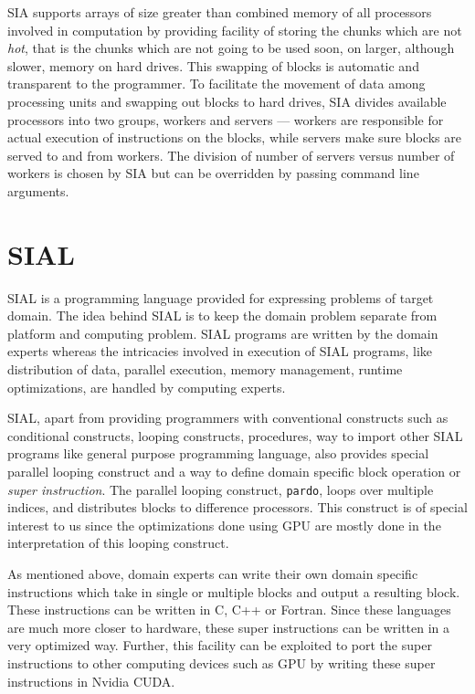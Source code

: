SIA supports arrays of size greater than combined memory of all processors
involved in computation by providing facility of storing the chunks which are
not \textit{hot}, that is the chunks which are not going to be used soon, on
larger, although slower, memory on hard drives. This swapping of blocks is automatic
and transparent to the programmer. To facilitate the movement of data among
processing units and swapping out blocks to hard drives, SIA divides available
processors into two groups, workers and servers --- workers are responsible for
actual execution of instructions on the blocks, while servers make sure blocks
are served to and from workers. The division of number of servers versus number
of workers is chosen by SIA but can be overridden by passing command line
arguments.

\section{SIAL}
SIAL is a programming language provided for expressing problems of target
domain. The idea behind SIAL is to keep the domain problem separate from
platform and computing problem. SIAL programs are written by the domain experts
whereas the intricacies involved in execution of SIAL programs, like distribution of
data, parallel execution, memory management, runtime optimizations, are handled
by computing experts.

SIAL, apart from providing programmers with conventional constructs such as
conditional constructs, looping constructs, procedures, way to import other SIAL
programs like general purpose programming language, also provides special parallel looping construct and a way
to define domain specific block operation or \textit{super instruction}. The
parallel looping construct, \texttt{pardo}, loops over multiple indices, and
distributes blocks to difference processors. This construct is of special
interest to us since the optimizations done using GPU are mostly done in the
interpretation of this looping construct.

As mentioned above, domain experts can write their own domain specific
instructions which take in single or multiple blocks and output a resulting block. These
instructions can be written in C, C++ or Fortran. Since these languages are much
more closer to hardware, these super instructions can be written in a very
optimized way. Further, this facility can be exploited to port the super instructions to
other computing devices such as GPU by writing these super instructions in
Nvidia CUDA.

